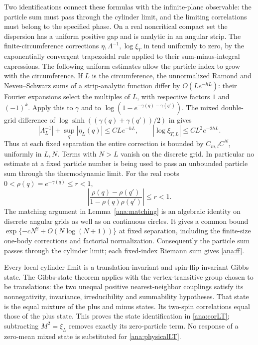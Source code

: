 \documentclass[11pt]{article}
\numberwithin{equation}{section}
\theoremstyle{definition}
\begin{document}
Two identifications connect these formulas with the infinite-plane
observable: the particle sum must pass through the cylinder limit,
and the limiting correlations must belong to the specified phase. On a real noncritical compact set the dispersion has a
uniform positive gap and is analytic in an angular strip. The
finite-circumference corrections \(\eta,\Lambda^{-1},\log\xi_T\)
in \cite{BL} tend uniformly to zero, by the exponentially convergent
trapezoidal rule applied to their sum-minus-integral expressions.
The following uniform estimates allow the particle index to grow
with the circumference. If \(L\) is the circumference, the unnormalized Ramond and
Neveu--Schwarz sums of a strip-analytic function differ by
\(O(Le^{-hL})\): their Fourier expansions select the multiples of
\(L\), with respective factors \(1\) and \((-1)^k\).
Apply this to \(\gamma\) and to
\(\log(1-e^{-\gamma(q)-\gamma(q')})\). The mixed double-grid
difference of \(\log\sinh((\gamma(q)+\gamma(q'))/2)\) in
\cite[(25)]{BL} gives
\[
 |\Lambda_L^{-1}|+\sup_q|\eta_L(q)|\le CLe^{-hL},\qquad
 |\log\xi_{T,L}|\le CL^2e^{-2hL}.
\]
Thus at each fixed separation the entire correction is bounded by
\(C_{m,l}C^N\), uniformly in \(L,N\). Terms with \(N>L\)
vanish on the discrete grid. In particular no estimate at a fixed
particle number is being used to pass an unbounded particle sum
through the thermodynamic limit.
For the real roots \(0<\rho(q)=e^{-\gamma(q)}\le r<1\),
\[
 \left|\frac{\rho(q)-\rho(q')}{1-\rho(q)\rho(q')}\right|\le r<1.
\]
The matching argument in Lemma~\ref{ana:matching} is an algebraic
identity on discrete angular grids as well as on continuous circles.
It gives a common bound
\(\exp\{-cN^2+O(N\log(N+1))\}\) at fixed separation, including
the finite-size one-body corrections and factorial normalization.
Consequently the particle sum passes through the cylinder limit;
each fixed-index Riemann sum gives \eqref{ana:ff}.

Every local cylinder limit is a translation-invariant and spin-flip
invariant Gibbs state. The Gibbs-state theorem
\cite[Theorem 1]{Raoufi} applies with the vertex-transitive group
chosen to be translations: the two unequal positive nearest-neighbor
couplings satisfy its nonnegativity, invariance, irreducibility and
summability hypotheses. That state is the equal mixture of the plus
and minus states. Its two-spin correlations equal those of the plus
state. This proves the state identification in \eqref{ana:corLT};
subtracting \(M^2=\xi_L\) removes exactly its zero-particle term.
No response of a zero-mean mixed state is substituted for
\eqref{ana:physicalLT}.
\end{document}
